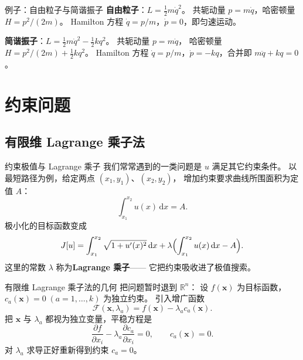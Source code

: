 \documentclass[fontset=windows, chinese, 10pt, xcolor=dvipsnames]{beamer}
\begin{document}
\begin{frame}{例子：自由粒子与简谐振子}
  \textbf{自由粒子}：$L=\tfrac{1}{2}m\dot q^2$。
  共轭动量 $p=m\dot q$，哈密顿量 $H=p^2/(2m)$。
  Hamilton 方程 $\dot q=p/m$，$\dot p=0$，即匀速运动。
  \vspace{0.3em}

  \textbf{简谐振子}：$L=\tfrac{1}{2}m\dot q^2-\tfrac{1}{2}kq^2$。
  共轭动量 $p=m\dot q$，
  哈密顿量 $H=p^2/(2m)+\tfrac{1}{2}kq^2$。
  Hamilton 方程 $\dot q=p/m$，$\dot p=-kq$，合并即
  $m\ddot q+kq=0$。
\end{frame}

\section{约束问题}

\subsection{有限维 Lagrange 乘子法}

\begin{frame}{约束极值与 Lagrange 乘子}
  我们常常遇到的一类问题是 $u$ 满足其它约束条件。
  以最短路径为例，给定两点 $(x_1,y_1)$、$(x_2,y_2)$，
  增加约束要求曲线所围面积为定值 $A$：
  \begin{equation*}
    \int_{x_1}^{x_2} u(x)\,\mathrm{d}x = A.
  \end{equation*}
  极小化的目标函数变成
  \[
    J[u] = \int_{x_1}^{x_2}\sqrt{1+u'(x)^2}\,\mathrm{d}x
         + \lambda\Bigl(\int_{x_1}^{x_2} u(x)\,\mathrm{d}x - A\Bigr).
  \]
  这里的常数 $\lambda$ 称为\textbf{Lagrange 乘子}——
  它把约束吸收进了极值搜索。
\end{frame}

\begin{frame}{有限维 Lagrange 乘子法的几何}
  把问题暂时退到 $\mathbb{R}^n$：
  设 $f(\mathbf{x})$ 为目标函数，
  $c_a(\mathbf{x})=0\;(a=1,\dots,k)$ 为独立约束。
  引入增广函数
  \begin{equation*}
    \mathcal{F}(\mathbf{x},\lambda_a)
    = f(\mathbf{x}) - \lambda_a c_a(\mathbf{x}).
  \end{equation*}
  把 $\mathbf{x}$ 与 $\lambda_a$ 都视为独立变量，平稳方程是
  \begin{equation*}
    \frac{\partial f}{\partial x_i}
    - \lambda_a\frac{\partial c_a}{\partial x_i} = 0,\qquad
    c_a(\mathbf{x}) = 0.
  \end{equation*}
  对 $\lambda_a$ 求导正好重新得到约束 $c_a=0$。
\end{frame}
\end{document}
